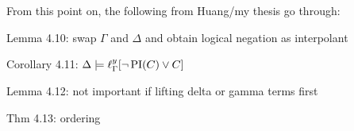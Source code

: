 From this point on, the following from Huang/my thesis go through:\nopagebreak

Lemma 4.10: swap $\Gamma$ and $\Delta$ and obtain logical negation as interpolant 

Corollary 4.11: $\Delta \models \ell_{\Gamma}^{y}[ \lnot \operatorname{PI}(C) \lor C]$ 

Lemma 4.12: not important if lifting delta or gamma terms first 

Thm 4.13: ordering 

